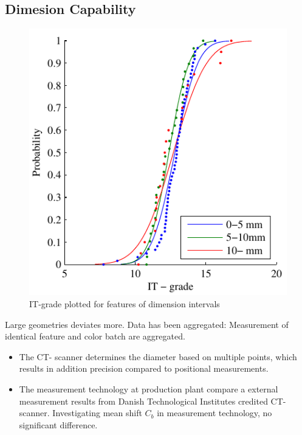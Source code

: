 \documentclass[aip,amsmath, reprint, author-year,nobalancelastpage]{revtex4-1}
\begin{document}
\subsection{Dimesion Capability}
\begin{figure}[H]
\includegraphics{ITG_DimSort.pdf}
\caption{\label{fig:ITG_DimSort} IT-grade plotted for features of dimension intervals  }
\end{figure}

Large geometries deviates more. 
Data has been aggregated: Measurement of identical feature and color batch are aggregated.

\begin{itemize}

\item The CT- scanner determines the diameter based on multiple points, which results in addition precision compared to positional measurements.

\item The measurement technology at production plant compare a external measurement results from Danish Technological Institutes credited CT-scanner. Investigating mean shift $C_b$ in measurement technology, no significant difference. 
\end{itemize}
\end{document}
